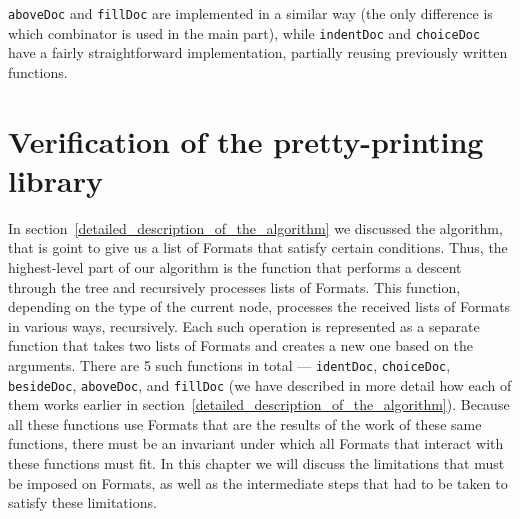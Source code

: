 \documentclass[14pt]{constructor-diploma}
\begin{document}
\texttt{aboveDoc} and \texttt{fillDoc} are implemented in a similar way (the only difference is which combinator is used in the main part), 
while \texttt{indentDoc} and \texttt{choiceDoc} have a fairly straightforward implementation, partially reusing previously written functions.

\label{chapter_verification}
\section{Verification of the pretty-printing library}
In section~\ref{detailed_description_of_the_algorithm} we discussed the algorithm, that is 
goint to give us a list of Formats that satisfy certain conditions. Thus, the highest-level part of our algorithm is the function that performs a descent through the tree and recursively processes lists of Formats.
This function, depending on the type of the current node, processes the received lists of Formats in various ways, recursively. 
Each such operation is represented as a separate function that takes two lists of Formats and creates a new one based on the arguments. 
There are 5 such functions in total --- \texttt{identDoc}, \texttt{choiceDoc}, \texttt{besideDoc}, \texttt{aboveDoc}, and \texttt{fillDoc} 
(we have described in more detail how each of them works earlier in section~\ref{detailed_description_of_the_algorithm}). 
Because all these functions use Formats that are the results of the work of these same functions, there must be an invariant under which all Formats that interact with these functions must fit. 
In this chapter we will discuss the limitations that must be imposed on Formats, as well as the intermediate steps that had to be taken to satisfy these limitations.
\end{document}
